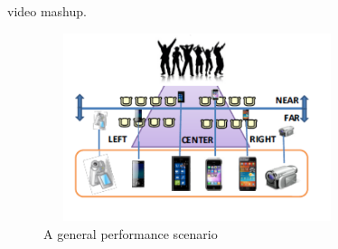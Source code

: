 \documentclass{sig-alternate}
\begin{document}
video mashup.\\
\begin{figure}[h!]

  \includegraphics[width=9cm, height=5.5cm]{video_5.pdf}
\caption{A general performance scenario}
\end{figure}
\end{document}
